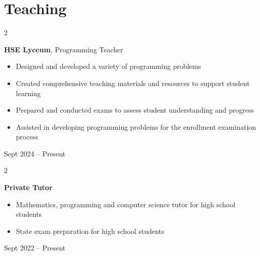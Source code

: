 \documentclass[10pt, letterpaper]{article}
\newenvironment{highlights}{
    \begin{itemize}[
        topsep=0.10 cm,
        parsep=0.10 cm,
        partopsep=0pt,
        itemsep=0pt,
        leftmargin=0.4 cm + 10pt
    ]
}{
    \end{itemize}
} %
\newenvironment{twocolentry}[2][]{
    \onecolentry
    \def\secondColumn{#2}
    \setcolumnwidth{\fill, 4.5 cm}
    \begin{paracol}{2}
}{
    \switchcolumn \raggedleft \secondColumn
    \end{paracol}
    \endonecolentry
} %
\begin{document}
    \section{Teaching}
        \begin{twocolentry}{
            Sept 2024 – Present
        }
            \textbf{HSE Lyceum}, Programming Teacher
                \begin{highlights}
                    \item Designed and developed a variety of programming problems
                    \item Created comprehensive teaching materials and resources to support student learning
                    \item Prepared and conducted exams to assess student understanding and progress
                    \item Assisted in developing programming problems for the enrollment examination process
                \end{highlights}
        \end{twocolentry}

        
        \begin{twocolentry}{
            Sept 2022 – Present
        }
            \textbf{Private Tutor}
            \begin{highlights}
                \item Mathematics, programming and computer science tutor for high school students
                \item State exam preparation for high school students
            \end{highlights}
        \end{twocolentry}
        \vspace{0.2 cm}  
\end{document}
